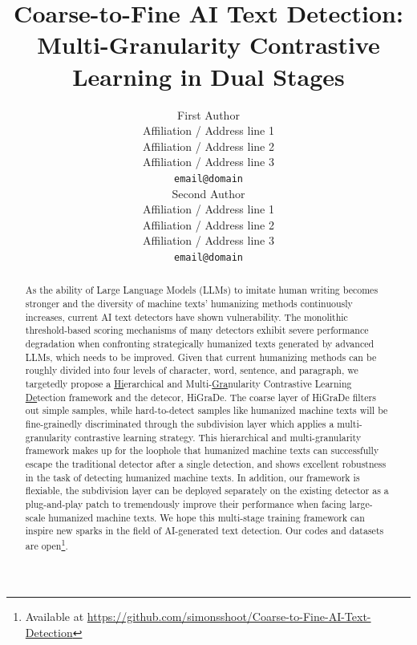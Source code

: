 \documentclass[11pt]{article}
\title{Coarse-to-Fine AI Text Detection: Multi-Granularity Contrastive Learning in Dual Stages}
\author{First Author \\
	Affiliation / Address line 1 \\
	Affiliation / Address line 2 \\
	Affiliation / Address line 3 \\
	\texttt{email@domain} \\\And
	Second Author \\
	Affiliation / Address line 1 \\
	Affiliation / Address line 2 \\
	Affiliation / Address line 3 \\
	\texttt{email@domain} \\}
\begin{document}
	\maketitle
	\begin{abstract}
		As the ability of Large Language Models (LLMs) to imitate human writing becomes stronger and the diversity of machine texts' humanizing methods continuously increases, current AI text detectors have shown vulnerability. The monolithic threshold-based scoring mechanisms of many detectors exhibit severe performance degradation when confronting strategically humanized texts generated by advanced LLMs, which needs to be improved. Given that current humanizing methods can be roughly divided into four levels of character, word, sentence, and paragraph, we targetedly propose a \underline{Hi}erarchical and Multi-\underline{Gra}nularity Contrastive Learning \underline{De}tection framework and the detecor, HiGraDe. The coarse layer of HiGraDe filters out simple samples, while hard-to-detect samples like humanized machine texts will be fine-grainedly discriminated through the subdivision layer which applies a multi-granularity contrastive learning strategy. This hierarchical and multi-granularity framework makes up for the loophole that humanized machine texts can successfully escape the traditional detector after a single detection, and shows excellent robustness in the task of detecting humanized machine texts. In addition, our framework is flexiable, the subdivision layer can be deployed separately on the existing detector as a plug-and-play patch to tremendously improve their performance when facing large-scale humanized machine texts. We hope this multi-stage training framework can inspire new sparks in the field of AI-generated text detection. Our codes and datasets are open\footnote{Available at \url{https://github.com/simonsshoot/Coarse-to-Fine-AI-Text-Detection}}.
	\end{abstract}
	

	
\end{document}
